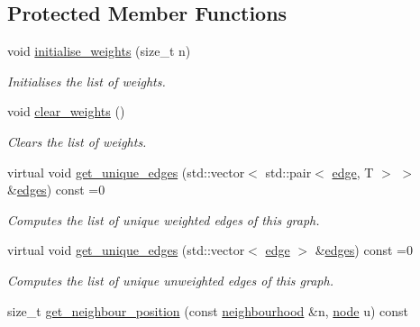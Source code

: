 \subsection*{Protected Member Functions}
\begin{DoxyCompactItemize}
\item 
\mbox{\label{classlgraph_1_1wxgraph_a3d0eed0195489df5db3e9383a5c91344}} 
void \hyperlink{classlgraph_1_1wxgraph_a3d0eed0195489df5db3e9383a5c91344}{initialise\+\_\+weights} (size\+\_\+t n)
\begin{DoxyCompactList}\small\item\em Initialises the list of weights. \end{DoxyCompactList}\item 
\mbox{\label{classlgraph_1_1wxgraph_a805868af4e350ccb6a4555cff3822d22}} 
void \hyperlink{classlgraph_1_1wxgraph_a805868af4e350ccb6a4555cff3822d22}{clear\+\_\+weights} ()
\begin{DoxyCompactList}\small\item\em Clears the list of weights. \end{DoxyCompactList}\item 
virtual void \hyperlink{classlgraph_1_1wxgraph_a50a9be174538c50c0f2a7ebeaa34ca4d}{get\+\_\+unique\+\_\+edges} (std\+::vector$<$ std\+::pair$<$ \hyperlink{namespacelgraph_a76bd7d50719f03de7a85db259d80d572}{edge}, T $>$ $>$ \&\hyperlink{classlgraph_1_1wxgraph_a1b89f56544185e33d54e72a8ed19a789}{edges}) const =0
\begin{DoxyCompactList}\small\item\em Computes the list of unique weighted edges of this graph. \end{DoxyCompactList}\item 
virtual void \hyperlink{classlgraph_1_1wxgraph_a6c1de8061b1606071320a01dd1b5fe64}{get\+\_\+unique\+\_\+edges} (std\+::vector$<$ \hyperlink{namespacelgraph_a76bd7d50719f03de7a85db259d80d572}{edge} $>$ \&\hyperlink{classlgraph_1_1wxgraph_a1b89f56544185e33d54e72a8ed19a789}{edges}) const =0
\begin{DoxyCompactList}\small\item\em Computes the list of unique unweighted edges of this graph. \end{DoxyCompactList}\item 
size\+\_\+t \hyperlink{classlgraph_1_1xxgraph_abb0c474cb162940aba3439124c1202d7}{get\+\_\+neighbour\+\_\+position} (const \hyperlink{namespacelgraph_a052e7766c13f3a43cec0aec8173fdede}{neighbourhood} \&n, \hyperlink{namespacelgraph_a397169dd66adf725210a30fb7251773e}{node} u) const

\end{DoxyCompactItemize}
